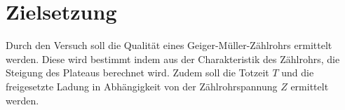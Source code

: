 \section{Zielsetzung}
\label{sec:zielsetzung}
Durch den Versuch soll die Qualität eines Geiger-Müller-Zählrohrs ermittelt werden.
Diese wird bestimmt indem aus der Charakteristik des Zählrohrs, die Steigung des Plateaus berechnet wird.
Zudem soll die Totzeit $T$ und die freigesetzte Ladung in Abhängigkeit von der Zählrohrspannung $Z$ ermittelt werden.